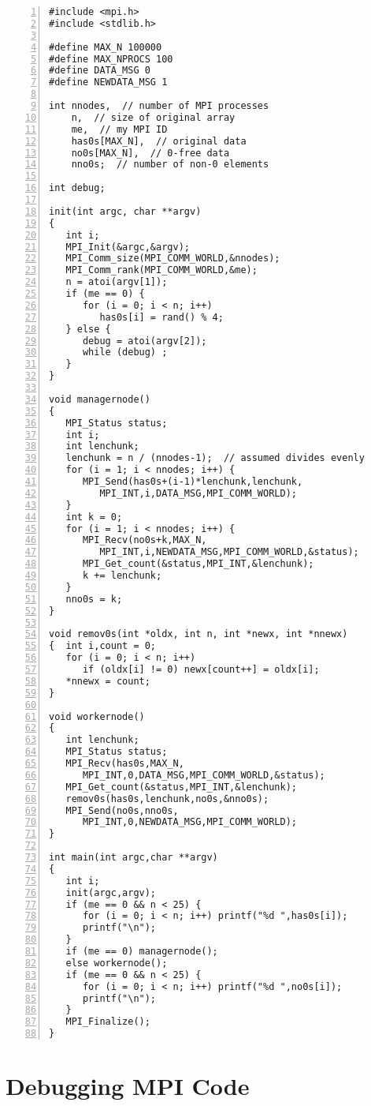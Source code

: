 \begin{lstlisting}[numbers=left]
#include <mpi.h>
#include <stdlib.h>

#define MAX_N 100000
#define MAX_NPROCS 100
#define DATA_MSG 0
#define NEWDATA_MSG 1

int nnodes,  // number of MPI processes
    n,  // size of original array
    me,  // my MPI ID
    has0s[MAX_N],  // original data
    no0s[MAX_N],  // 0-free data
    nno0s;  // number of non-0 elements

int debug;

init(int argc, char **argv)
{  
   int i;
   MPI_Init(&argc,&argv);
   MPI_Comm_size(MPI_COMM_WORLD,&nnodes);
   MPI_Comm_rank(MPI_COMM_WORLD,&me);
   n = atoi(argv[1]);
   if (me == 0) {
      for (i = 0; i < n; i++) 
         has0s[i] = rand() % 4;
   } else {
      debug = atoi(argv[2]);
      while (debug) ;
   }
}

void managernode()
{  
   MPI_Status status;
   int i;
   int lenchunk;
   lenchunk = n / (nnodes-1);  // assumed divides evenly
   for (i = 1; i < nnodes; i++) {
      MPI_Send(has0s+(i-1)*lenchunk,lenchunk,
         MPI_INT,i,DATA_MSG,MPI_COMM_WORLD);
   }
   int k = 0;
   for (i = 1; i < nnodes; i++) {
      MPI_Recv(no0s+k,MAX_N,
         MPI_INT,i,NEWDATA_MSG,MPI_COMM_WORLD,&status);
      MPI_Get_count(&status,MPI_INT,&lenchunk);
      k += lenchunk;
   }
   nno0s = k;
}

void remov0s(int *oldx, int n, int *newx, int *nnewx)
{  int i,count = 0;
   for (i = 0; i < n; i++)
      if (oldx[i] != 0) newx[count++] = oldx[i];
   *nnewx = count;
}

void workernode()
{
   int lenchunk;
   MPI_Status status;
   MPI_Recv(has0s,MAX_N,
      MPI_INT,0,DATA_MSG,MPI_COMM_WORLD,&status);
   MPI_Get_count(&status,MPI_INT,&lenchunk);
   remov0s(has0s,lenchunk,no0s,&nno0s);
   MPI_Send(no0s,nno0s,
      MPI_INT,0,NEWDATA_MSG,MPI_COMM_WORLD);
}

int main(int argc,char **argv)
{
   int i;
   init(argc,argv);
   if (me == 0 && n < 25) {
      for (i = 0; i < n; i++) printf("%d ",has0s[i]);
      printf("\n");
   }
   if (me == 0) managernode();
   else workernode();
   if (me == 0 && n < 25) {
      for (i = 0; i < n; i++) printf("%d ",no0s[i]);
      printf("\n");
   }
   MPI_Finalize();
}
\end{lstlisting}

\section{Debugging MPI Code}

